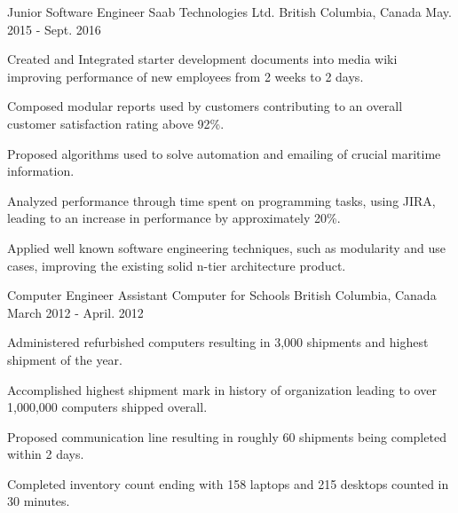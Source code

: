 

\begin{cventries}

  \cventry
    {Junior Software Engineer} %
    {Saab Technologies Ltd.} %
    {British Columbia, Canada} %
    {May. 2015 - Sept. 2016} %
    {
      \begin{cvitems} %
        \item {Created and Integrated starter development documents into media wiki improving performance of new employees from 2 weeks to 2 days.}
        \item {Composed modular reports used by customers contributing to an overall customer satisfaction rating above 92\%.}
        \item {Proposed algorithms used to solve automation and emailing of crucial maritime information.}
        \item {Analyzed performance through time spent on programming tasks, using JIRA, leading to an increase in performance by approximately 20\%.}
        \item {Applied well known software engineering techniques, such as modularity and use cases, improving the existing solid n-tier architecture product.}
      \end{cvitems}
    }

  \cventry
    {Computer Engineer Assistant} %
    {Computer for Schools} %
    {British Columbia, Canada} %
    {March 2012 - April. 2012} %
    {
      \begin{cvitems} %
        \item {Administered refurbished computers resulting in 3,000 shipments and highest shipment of the year.}
        \item {Accomplished highest shipment mark in history of organization leading to over 1,000,000 computers shipped overall.}
        \item {Proposed communication line resulting in roughly 60 shipments being completed within 2 days.}
        \item {Completed inventory count ending with 158 laptops and 215 desktops counted in 30 minutes.}
      \end{cvitems}
    }
\end{cventries}
